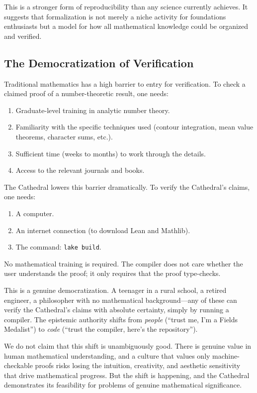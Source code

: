 \noindent This is a stronger form of reproducibility than any
science currently achieves. It suggests that formalization is not
merely a niche activity for foundations enthusiasts but a model
for how all mathematical knowledge could be organized and verified.

\subsection{The Democratization of Verification}

Traditional mathematics has a high barrier to entry for
verification. To check a claimed proof of a number-theoretic
result, one needs:

\begin{enumerate}
  \item Graduate-level training in analytic number theory.
  \item Familiarity with the specific techniques used (contour
    integration, mean value theorems, character sums, etc.).
  \item Sufficient time (weeks to months) to work through the
    details.
  \item Access to the relevant journals and books.
\end{enumerate}

The Cathedral lowers this barrier dramatically. To verify the
Cathedral's claims, one needs:

\begin{enumerate}
  \item A computer.
  \item An internet connection (to download Lean and Mathlib).
  \item The command: \texttt{lake build}.
\end{enumerate}

\noindent No mathematical training is required. The compiler
does not care whether the user understands the proof; it only
requires that the proof type-checks.

This is a genuine democratization. A teenager in a rural
school, a retired engineer, a philosopher with no mathematical
background---any of these can verify the Cathedral's claims
with absolute certainty, simply by running a compiler. The
epistemic authority shifts from \emph{people} (``trust me, I'm a
Fields Medalist'') to \emph{code} (``trust the compiler, here's
the repository'').

We do not claim that this shift is unambiguously good. There
is genuine value in human mathematical understanding, and a
culture that values only machine-checkable proofs risks losing
the intuition, creativity, and aesthetic sensitivity that drive
mathematical progress. But the shift is happening, and the
Cathedral demonstrates its feasibility for problems of genuine
mathematical significance.

